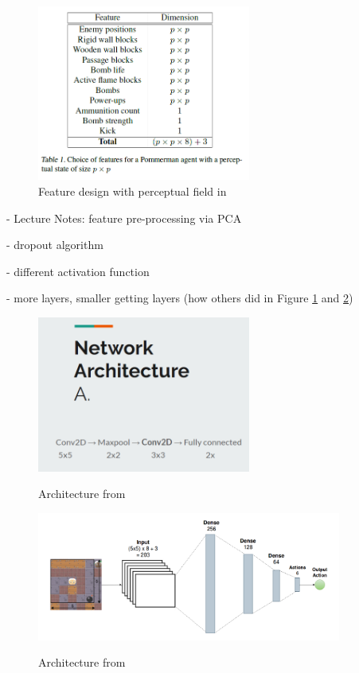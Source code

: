 \documentclass[a4paper ,12pt]{report}
\begin{document}
	\begin{figure}[ht]
		\caption{Feature design with perceptual field in \cite{Pommerman}}
		\includegraphics[width=7cm]{features_with_perceptual_field.png}
	\end{figure}
	
	- Lecture Notes: feature pre-processing via PCA
	
	- dropout algorithm 
	
	- different activation function
	
	- more layers, smaller getting layers (how others did in Figure \ref{fig:arch1} and \ref{fig:arch2})
	
	\begin{figure}[ht]
		\caption{Architecture from \cite{AlanPresentation}}
		\includegraphics[width=7cm]{architecture.png}
		\label{fig:arch1}
	\end{figure}

	\begin{figure}[ht]
		\caption{Architecture from \cite{Pommerman}}
		\includegraphics[width=10cm]{architecture_2.png}
		\label{fig:arch2}
	\end{figure}
	
\end{document}
